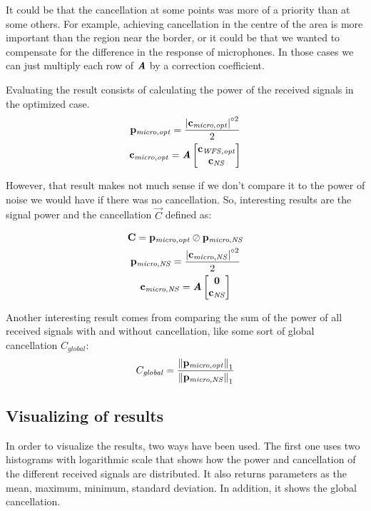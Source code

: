 It could be that the cancellation at some points was more of a priority than at some others. For example, achieving cancellation in the centre of the area is more important than the region near the border, or it could be that we wanted to compensate for the difference in the response of microphones. In those cases we can just multiply each row of $\bm{\mathit{A}}$ by a correction coefficient.

Evaluating the result consists of calculating the power of the received signals in the optimized case.
\begin{gather}
	\mathbf{p_\mathit{micro,opt}} = \frac{\left| \mathbf{c_{\mathit{micro,opt}}} \right|^{\circ 2}}{2}
	\\
	\mathbf{c_\mathit{\mathit{micro,opt}}} = \bm{\mathit{A}}
	\begin{bmatrix}
	\mathbf{c_\mathit{WFS,opt}} \\
	\mathbf{c_{\mathit{NS}}}
	\end{bmatrix}
\end{gather}

However, that result makes not much sense if we don't compare it to the power of noise we would have if there was no cancellation. So, interesting results are the signal power and the cancellation $\vec{C}$ defined as:

\begin{gather}
\mathbf{C} = \mathbf{p_\mathit{micro,opt}} \oslash \mathbf{p_\mathit{micro,NS}} \\
\mathbf{p_\mathit{micro,NS}} = \frac{\left| \mathbf{c_{\mathit{micro,NS}}} \right|^{\circ 2}}{2}\\
\mathbf{c_{\mathit{micro,NS}}} = \bm{\mathit{A}} 
\begin{bmatrix}
	\mathbf{0} \\
	\mathbf{c_{\mathit{NS}}}
\end{bmatrix}
\end{gather}

Another interesting result comes from comparing the sum of the power of all received signals with and without cancellation, like some sort of global cancellation $C_\mathit{global}$:
\begin{equation}
C_\mathit{global} = \frac{\left\| \mathbf{p_\mathit{micro,opt}} \right\|_1}{\left\| \mathbf{p_\mathit{micro,NS}} \right\|_1}
\end{equation}

\subsection{Visualizing of results}
In order to visualize the results, two ways have been used. The first one uses two histograms with logarithmic scale that shows how the power and cancellation of the different received signals are distributed. It also returns parameters as the mean, maximum, minimum, standard deviation. In addition, it shows the global cancellation.

